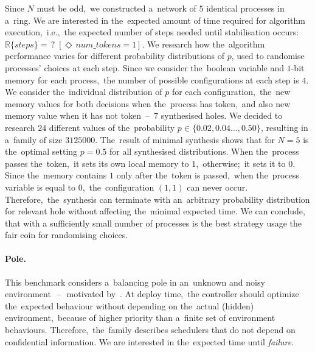 Since $N$ must be odd,~we constructed a~network of $5$ identical processes in a~ring.
We are interested in the~expected amount of time required for algorithm execution,~i.e.,~the expected number of steps needed until stabilisation occurs:~$\mathbb{R}\{steps\} = \, ? \; [\Diamond \, num\_tokens=1]$.
We research how the~algorithm performance varies for different probability distributions of $\mathit{p}$, used to randomise processes' choices at each step. 
Since we consider the~boolean variable and $\mathit{1}$-bit memory for each process,~the number of possible configurations at each step is $4$.
We consider the~individual distribution of $\mathit{p}$ for each configuration,~the~new memory values for both decisions when the~process has token,~and also new memory value when it has not token \,--\, $7$ synthesised holes.
We decided to research $24$ different values of the~probability $\mathit{p} \in \{0.02, 0.04 \dots, 0.50 \}$, resulting in a~family of size $3125000$.
The~result of minimal synthesis shows that for $N=5$ is the~optimal setting $\mathit{p=0.5}$ for all synthesised distributions.
When the~process passes the~token,~it sets its own local memory to $1$,~otherwise;~it sets it to $0$.
Since the~memory contains $1$ only after the~token is passed,~when the~process variable is equal to $0$,~the~configuration $(1, 1)$ can never occur.
Therefore,~the~synthesis can terminate with an~arbitrary probability distribution for relevant hole without affecting the~minimal expected time.
We can conclude, that with a sufficiently small number of processes is the best strategy usage the fair coin for randomising choices.

\paragraph{Pole.}
This benchmark considers a~balancing pole in an~unknown and noisy environment~\,--\,~motivated by~\cite{pole-1,pole-2}.
At deploy time,~the controller should optimize the~expected behaviour without depending on the~actual (hidden) environment,~because of higher priority than a~finite set of environment behaviours.
Therefore,~the~family describes schedulers that do not depend on confidential information.
We are interested in the~expected time until \textit{failure}.

